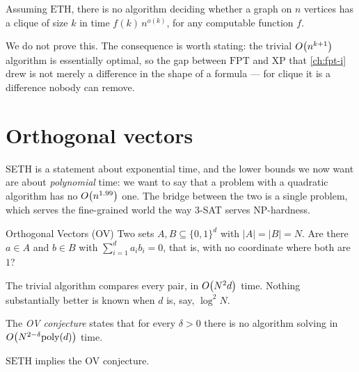 \begin{theorem}\label{thm:eth-clique}
Assuming $\mathrm{ETH}$, there is no algorithm deciding whether a graph on $n$
vertices has a clique of size $k$ in time $f(k)\, n^{o(k)}$, for any computable
function $f$.
\end{theorem}

We do not prove this. The consequence is worth stating: the trivial
$O\!\left(n^{k+1}\right)$ algorithm is essentially optimal, so the gap between
$\mathrm{FPT}$ and $\mathrm{XP}$ that \cref{ch:fpt-i} drew is not merely a
difference in the shape of a formula --- for clique it is a difference nobody
can remove.

\section{Orthogonal vectors}
\label{sec:ov}

SETH is a statement about exponential time, and the lower bounds we now want
are about \emph{polynomial} time: we want to say that a problem with a
quadratic algorithm has no $O\!\left(n^{1.99}\right)$ one. The bridge between the two
is a single problem, which serves the fine-grained world the way $3$-SAT
serves \textrm{NP}-hardness.

\begin{probdef}{Orthogonal Vectors (OV)}
  \instance Two sets $A, B \subseteq \{0,1\}^d$ with $|A| = |B| = N$.
  \question Are there $a \in A$ and $b \in B$ with
  $\sum_{i=1}^{d} a_i b_i = 0$, that is, with no coordinate where both are
  $1$?
\end{probdef}

The trivial algorithm compares every pair, in $O\!\left(N^2 d\right)$ time. Nothing
substantially better is known when $d$ is, say, $\log^2 N$.

\begin{definition}\label{def:ov-conjecture}
The \emph{OV conjecture} states that for every $\delta > 0$ there is no
algorithm solving  in $O\!\left(N^{2-\delta}\mathrm{poly}(d)\right)$
time.
\end{definition}

\begin{theorem}\label{thm:seth-ov}
$\mathrm{SETH}$ implies the OV conjecture.
\end{theorem}


